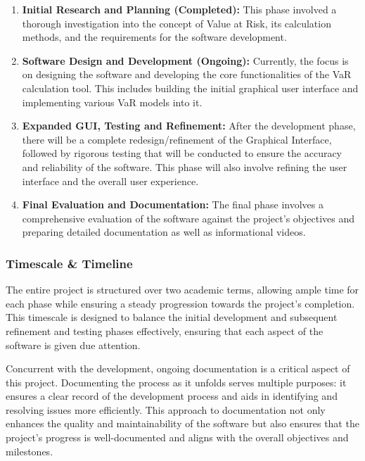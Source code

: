 \documentclass{article}
\begin{document}
  \begin{enumerate}
    \item \textbf{Initial Research and Planning (Completed):} This phase involved a thorough investigation into the concept of Value at Risk, its calculation methods, and the requirements for the software development.
    \item \textbf{Software Design and Development (Ongoing):} Currently, the focus is on designing the software and developing the core functionalities of the VaR calculation tool. This includes building the initial graphical user interface and implementing various VaR models into it.
    \item \textbf{Expanded GUI, Testing and Refinement:} After the development phase, there will be a complete redesign/refinement of the Graphical Interface, followed by rigorous testing that will be conducted to ensure the accuracy and reliability of the software. This phase will also involve refining the user interface and the overall user experience.
    \item \textbf{Final Evaluation and Documentation:} The final phase involves a comprehensive evaluation of the software against the project's objectives and preparing detailed documentation as well as informational videos.
  \end{enumerate}

  \subsubsection{Timescale \& Timeline}
  The entire project is structured over two academic terms, allowing ample time for each phase while ensuring a steady progression towards the project's completion. This timescale is designed to balance the initial development and subsequent refinement and testing phases effectively, ensuring that each aspect of the software is given due attention.\\\vspace{0.3cm}

  Concurrent with the development, ongoing documentation is a critical aspect of this project. Documenting the process as it unfolds serves multiple purposes: it ensures a clear record of the development process and aids in identifying and resolving issues more efficiently. This approach to documentation not only enhances the quality and maintainability of the software but also ensures that the project's progress is well-documented and aligns with the overall objectives and milestones.
\end{document}
